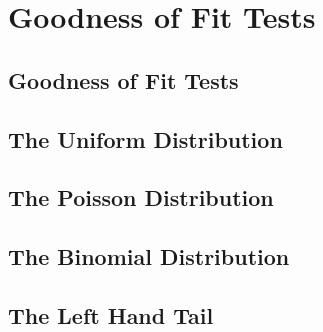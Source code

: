 \documentclass[../alevelmaths.tex]{subfiles}
\begin{document}
\chapter{Goodness of Fit Tests}
\section{Goodness of Fit Tests}
\section{The Uniform Distribution}
\section{The Poisson Distribution}
\section{The Binomial Distribution}
\section{The Left Hand Tail}
\end{document}
